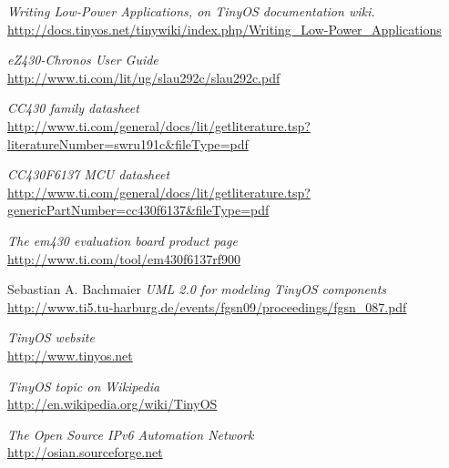 \begin{thebibliography}{99}
  \textit{Writing Low-Power Applications, on TinyOS documentation wiki.} \\
  \url{http://docs.tinyos.net/tinywiki/index.php/Writing_Low-Power_Applications}

  \textit{eZ430-Chronos User Guide} \\
  \url{http://www.ti.com/lit/ug/slau292c/slau292c.pdf}

  \textit{CC430 family datasheet}\\
  \url{http://www.ti.com/general/docs/lit/getliterature.tsp?literatureNumber=swru191c&fileType=pdf}

  \textit{CC430F6137 MCU datasheet} \\
  \url{http://www.ti.com/general/docs/lit/getliterature.tsp?genericPartNumber=cc430f6137&fileType=pdf}

  \textit{The em430 evaluation board product page} \\
  \url{http://www.ti.com/tool/em430f6137rf900}

  Sebastian A. Bachmaier
  \textit{UML 2.0 for modeling TinyOS components} \\
  \url{http://www.ti5.tu-harburg.de/events/fgsn09/proceedings/fgsn_087.pdf}

  \textit{TinyOS website} \\
  \url{http://www.tinyos.net}

  \textit{TinyOS topic on Wikipedia} \\
  \url{http://en.wikipedia.org/wiki/TinyOS}

  \textit{The Open Source IPv6 Automation Network} \\
  \url{http://osian.sourceforge.net}


\end{thebibliography}
